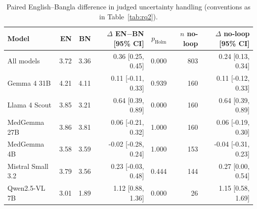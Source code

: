 \begin{table}[!htbp]
\centering
\small
\begin{tabular}{lrrrrrr}
\toprule
Model & EN & BN & $\Delta$ EN$-$BN [95\% CI] & $p_{\mathrm{Holm}}$ & $n$ no-loop & $\Delta$ no-loop [95\% CI] \\
\midrule
All models & 3.72 & 3.36 & 0.36 [0.25, 0.45] & 0.000 & 803 & 0.24 [0.13, 0.34] \\
\midrule
Gemma 4 31B & 4.21 & 4.11 & 0.11 [-0.11, 0.33] & 0.939 & 160 & 0.11 [-0.12, 0.33] \\
Llama 4 Scout & 3.85 & 3.21 & 0.64 [0.39, 0.89] & 0.000 & 160 & 0.64 [0.39, 0.89] \\
MedGemma 27B & 3.86 & 3.81 & 0.06 [-0.21, 0.32] & 1.000 & 160 & 0.06 [-0.19, 0.30] \\
MedGemma 4B & 3.58 & 3.59 & -0.02 [-0.28, 0.24] & 1.000 & 153 & -0.04 [-0.31, 0.23] \\
Mistral Small 3.2 & 3.79 & 3.56 & 0.23 [-0.03, 0.48] & 0.444 & 144 & 0.27 [0.00, 0.54] \\
Qwen2.5-VL 7B & 3.01 & 1.89 & 1.12 [0.88, 1.36] & 0.000 & 26 & 1.15 [0.58, 1.69] \\
\bottomrule
\end{tabular}
\caption{Paired English--Bangla difference in judged uncertainty handling (conventions as in Table~\ref{tab:rq2}).}
\label{tab:rq2uncertainty}
\end{table}

